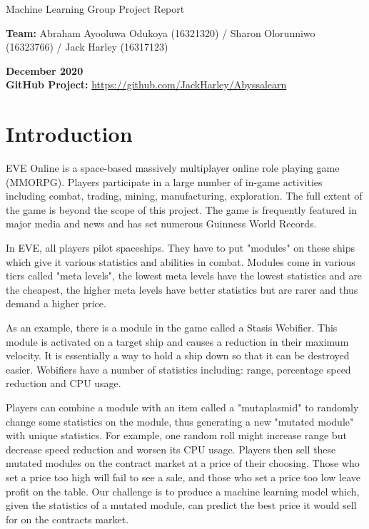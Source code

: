 \documentclass[10pt]{article}
\begin{document}
\begin{singlespace}
	
	\begin{center}
		\begin{huge}
			Machine Learning Group Project Report
		\end{huge}
	\end{center}
	\bigskip
	
	\textbf{Team:} Abraham Ayooluwa Odukoya (16321320) / Sharon Olorunniwo (16323766) / Jack Harley (16317123)
	
	\bigskip
	
	\textbf{December 2020}\\
	\textbf{GitHub Project:} \url{https://github.com/JackHarley/Abyssalearn}
\end{singlespace}

\setlength{\parskip}{0.7em}

\section{Introduction}
	EVE Online is a space-based massively multiplayer online role playing game (MMORPG). Players participate in a large number of in-game activities including combat, trading, mining, manufacturing, exploration. The full extent of the game is beyond the scope of this project. The game is frequently featured in major media and news and has set numerous Guinness World Records.
	
	In EVE, all players pilot spaceships. They have to put "modules" on these ships which give it various statistics and abilities in combat. Modules come in various tiers called "meta levels", the lowest meta levels have the lowest statistics and are the cheapest, the higher meta levels have better statistics but are rarer and thus demand a higher price.
	
	As an example, there is a module in the game called a Stasis Webifier. This module is activated on a target ship and causes a reduction in their maximum velocity. It is essentially a way to hold a ship down so that it can be destroyed easier. Webifiers have a number of statistics including: range, percentage speed reduction and CPU usage.
	
	Players can combine a module with an item called a "mutaplasmid" to randomly change some statistics on the module, thus generating a new "mutated module" with unique statistics. For example, one random roll might increase range but decrease speed reduction and worsen its CPU usage. Players then sell these mutated modules on the contract market at a price of their choosing. Those who set a price too high will fail to see a sale, and those who set a price too low leave profit on the table. Our challenge is to produce a machine learning model which, given the statistics of a mutated module, can predict the best price it would sell for on the contracts market.
	
\end{document}
